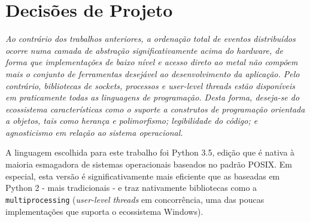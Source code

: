 \documentclass[a4paper,12pt]{article}
\begin{document}

        
        \section{Decisões de Projeto}
        
            \em{}Ao contrário dos trabalhos anteriores, a ordenação total de eventos distribuídos ocorre numa camada de abstração significativamente acima do hardware, de forma que implementações de baixo nível e acesso direto ao metal não compõem mais o conjunto de ferramentas desejável ao desenvolvimento da aplicação.
            Pelo contrário, bibliotecas de \emph{sockets}, processos e \emph{user-level threads} estão disponíveis em praticamente todas as linguagens de programação.
            Desta forma, deseja-se do ecossistema características como o suporte a construtos de programação orientada a objetos, tais como herança e polimorfismo; legibilidade do código; e agnosticismo em relação ao sistema operacional.
            
            A linguagem escolhida para este trabalho foi Python 3.5, edição que é nativa à maioria esmagadora de sistemas operacionais baseados no padrão POSIX.
            Em especial, esta versão é significativamente mais eficiente que as baseadas em Python 2 - mais tradicionais - e traz nativamente bibliotecas como a \texttt{multiprocessing}\cite{WEBSITE:8} (\emph{user-level threads} em concorrência, uma das poucas implementações que suporta o ecossistema Windows).
            
\end{document}
